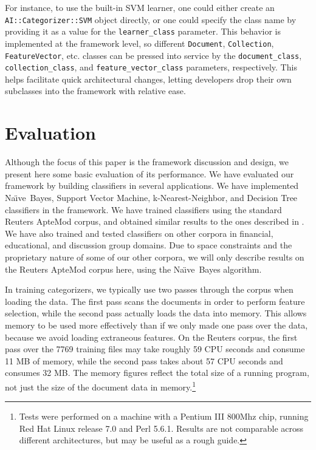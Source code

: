 \documentclass[twocolumn]{article}
\newcommand{\naive}{Na\"\i ve}
\begin{document}
For instance, to use the built-in SVM learner, one could either create
an \texttt{AI::Categorizer::SVM} object directly, or one could specify
the class name by providing it as a value for the
\texttt{learner\_class} parameter.  This behavior is implemented at
the framework level, so different \texttt{Document},
\texttt{Collection}, \texttt{FeatureVector}, etc. classes can be
pressed into service by the \texttt{document\_class},
\texttt{collection\_class}, and \texttt{feature\_vector\_class}
parameters, respectively.  This helps facilitate quick architectural
changes, letting developers drop their own subclasses into the
framework with relative ease.


\section{Evaluation}

Although the focus of this paper is the framework discussion and
design, we present here some basic evaluation of its performance.
We have evaluated our framework by building classifiers in several
applications.  We have implemented \naive\ Bayes, Support Vector
Machine, k-Nearest-Neighbor, and Decision Tree classifiers in the
framework.  We have trained classifiers using the standard Reuters
ApteMod corpus, and obtained similar results to the ones described in
\cite{yang:99}.  We have also trained and tested classifiers on other
corpora in financial, educational, and discussion group domains.  Due
to space constraints and the proprietary nature of some of our other
corpora, we will only describe results on the Reuters ApteMod corpus
here, using the \naive\ Bayes algorithm.

In training categorizers, we typically use two passes through the
corpus when loading the data.  The first pass scans the documents in
order to perform feature selection, while the second pass actually
loads the data into memory.  This allows memory to be used more
effectively than if we only made one pass over the data, because we
avoid loading extraneous features.  On the Reuters corpus, the first
pass over the 7769 training files may take roughly 59 CPU seconds and
consume 11 MB of memory, while the second pass takes about 57 CPU
seconds and consumes 32 MB\@.  The memory figures reflect the total
size of a running program, not just the size of the document data in
memory.\footnote{Tests were performed on a machine with a Pentium III
800Mhz chip, running Red Hat Linux release 7.0 and Perl 5.6.1.
Results are not comparable across different architectures, but may be
useful as a rough guide.}
\end{document}
